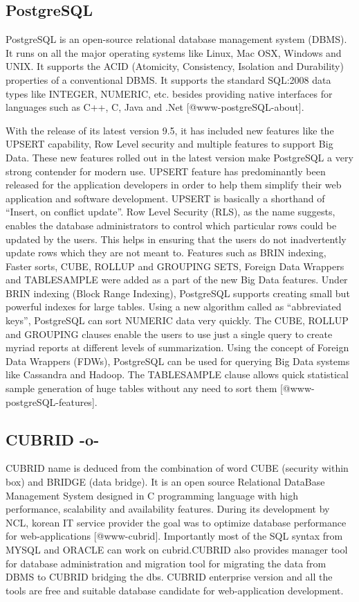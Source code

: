      
\subsection{PostgreSQL}

PostgreSQL is an open-source relational database management system
(DBMS).  It runs on all the major operating systems like Linux, Mac
OSX, Windows and UNIX.  It supports the ACID (Atomicity, Consistency,
Isolation and Durability) properties of a conventional DBMS.  It
supports the standard SQL:2008 data types like INTEGER, NUMERIC,
etc. besides providing native interfaces for languages such as C++, C,
Java and .Net [@www-postgreSQL-about].

With the release of its latest version 9.5, it has included new
features like the UPSERT capability, Row Level security and multiple
features to support Big Data.  These new features rolled out in the
latest version make PostgreSQL a very strong contender for modern use.
UPSERT feature has predominantly been released for the application
developers in order to help them simplify their web application and
software development.  UPSERT is basically a shorthand of ``Insert, on
conflict update''.  Row Level Security (RLS), as the name suggests,
enables the database administrators to control which particular rows
could be updated by the users.  This helps in ensuring that the users
do not inadvertently update rows which they are not meant to.
Features such as BRIN indexing, Faster sorts, CUBE, ROLLUP and
GROUPING SETS, Foreign Data Wrappers and TABLESAMPLE were added as a
part of the new Big Data features.  Under BRIN indexing (Block Range
Indexing), PostgreSQL supports creating small but powerful indexes for
large tables.  Using a new algorithm called as ``abbreviated keys'',
PostgreSQL can sort NUMERIC data very quickly.  The CUBE, ROLLUP and
GROUPING clauses enable the users to use just a single query to create
myriad reports at different levels of summarization.  Using the
concept of Foreign Data Wrappers (FDWs), PostgreSQL can be used for
querying Big Data systems like Cassandra and Hadoop.  The TABLESAMPLE
clause allows quick statistical sample generation of huge tables
without any need to sort them [@www-postgreSQL-features].

\subsection{CUBRID -o-}

CUBRID name is deduced from the combination of word CUBE (security
within box) and BRIDGE (data bridge).  It is an open source Relational
DataBase Management System designed in C programming language with
high performance, scalability and availability features. During its
development by NCL, korean IT service provider the goal was to
optimize database performance for
web-applications [@www-cubrid]. Importantly most of the SQL syntax
from MYSQL and ORACLE can work on cubrid.CUBRID also provides manager
tool for database administration and migration tool for migrating the
data from DBMS to CUBRID bridging the dbs.  CUBRID enterprise version
and all the tools are free and suitable database candidate for
web-application development.



